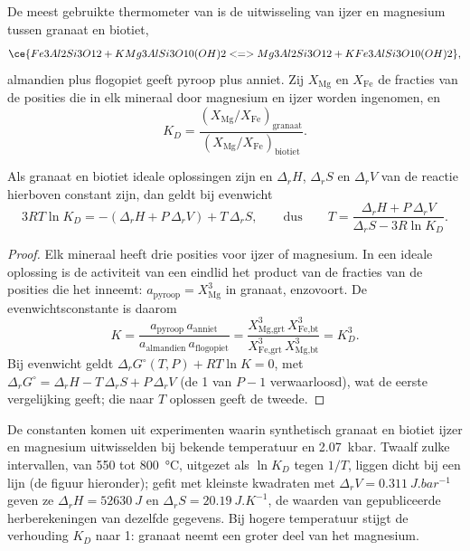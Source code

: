 De meest gebruikte thermometer van  is de uitwisseling van ijzer en magnesium
tussen granaat en biotiet,
\[
\ce{Fe3Al2Si3O12 + KMg3AlSi3O10(OH)2 <=> Mg3Al2Si3O12 + KFe3AlSi3O10(OH)2},
\]
almandien plus flogopiet geeft pyroop plus anniet. Zij $X_{\text{Mg}}$ en $X_{\text{Fe}}$
de fracties van de posities die in elk mineraal door magnesium en ijzer worden ingenomen, en
\[
K_D = \frac{(X_{\text{Mg}}/X_{\text{Fe}})_{\text{granaat}}}{(X_{\text{Mg}}/X_{\text{Fe}})_{\text{biotiet}}}.
\]

\begin{proposition}\label{prop:b2:pt-paths:exchange}
Als granaat en biotiet ideale oplossingen zijn en $\Delta_r H$, $\Delta_r S$ en $\Delta_r V$ van
de reactie hierboven constant zijn, dan geldt bij evenwicht
\[
3RT\ln K_D = -(\Delta_r H + P\,\Delta_r V) + T\,\Delta_r S,
\qquad\text{dus}\qquad
T = \frac{\Delta_r H + P\,\Delta_r V}{\Delta_r S - 3R\ln K_D}.
\]
\end{proposition}

\begin{proof}
Elk mineraal heeft drie posities voor ijzer of magnesium. In een ideale oplossing is de activiteit van
een eindlid het product van de fracties van de posities die het inneemt: $a_{\text{pyroop}} =
X_{\text{Mg}}^3$ in granaat, enzovoort. De evenwichtsconstante is daarom
\[
K = \frac{a_{\text{pyroop}}\,a_{\text{anniet}}}{a_{\text{almandien}}\,a_{\text{flogopiet}}}
= \frac{X_{\text{Mg,grt}}^3\,X_{\text{Fe,bt}}^3}{X_{\text{Fe,grt}}^3\,X_{\text{Mg,bt}}^3} = K_D^3 .
\]
Bij evenwicht geldt $\Delta_r G^\circ(T, P) + RT\ln K = 0$, met $\Delta_r G^\circ = \Delta_r H -
T\,\Delta_r S + P\,\Delta_r V$ (de 1 van $P - 1$ verwaarloosd), wat de eerste vergelijking geeft;
die naar $T$ oplossen geeft de tweede.
\end{proof}

De constanten komen uit experimenten waarin synthetisch granaat en biotiet ijzer
en magnesium uitwisselden bij bekende temperatuur en \qty{2.07}{kbar}. Twaalf zulke intervallen, van 550 tot
\qty{800}{\celsius}, uitgezet als $\ln K_D$ tegen $1/T$, liggen dicht bij een lijn (de figuur
hieronder); gefit met kleinste kwadraten met $\Delta_r V = \qty{0.311}{J.bar^{-1}}$ geven ze
$\Delta_r H = \qty{52630}{J}$ en $\Delta_r S = \qty{20.19}{J.K^{-1}}$, de waarden van
gepubliceerde herberekeningen van dezelfde gegevens. Bij hogere temperatuur stijgt de verhouding $K_D$
naar 1: granaat neemt een groter deel van het magnesium.

